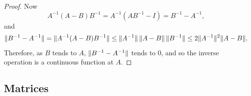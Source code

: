 \begin{proof}
Now
\begin{equation*}
A^{-1}(A-B)B^{-1} = 
A^{-1}(AB^{-1}-I) = 
B^{-1}-A^{-1} ,
\end{equation*}
and
\begin{equation*}
\lVert {B^{-1}-A^{-1}} \rVert =
\lVert {A^{-1}(A-B)B^{-1}} \rVert \leq
\lVert {A^{-1}} \rVert\,\lVert {A-B} \rVert\,\lVert {B^{-1}} \rVert
\leq
2\lVert {A^{-1}} \rVert^2
\lVert {A-B} \rVert .
\end{equation*}
Therefore, as $B$ tends to $A$, $\lVert {B^{-1}-A^{-1}} \rVert$ tends to 0, and
so the inverse operation is a continuous function at $A$.
\end{proof}

\subsection{Matrices}

